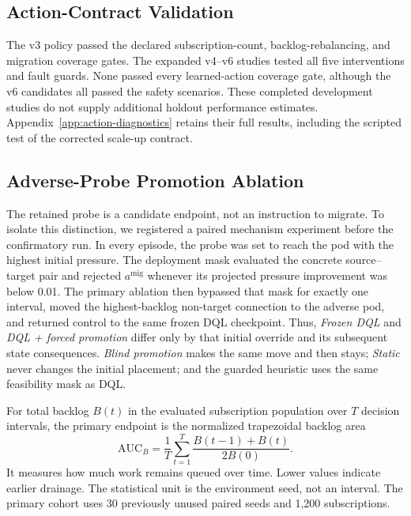 \subsection{Action-Contract Validation}

The v3 policy passed the declared subscription-count, backlog-rebalancing,
and migration coverage gates. The expanded v4--v6 studies tested all five
interventions and fault guards. None passed every learned-action coverage
gate, although the v6 candidates all passed the safety scenarios. These
completed development studies do not supply additional holdout performance
estimates. Appendix~\ref{app:action-diagnostics} retains their full results,
including the scripted test of the corrected scale-up contract.

\subsection{Adverse-Probe Promotion Ablation}
\label{sec:adverse-probe-ablation}

The retained probe is a candidate endpoint, not an instruction to migrate.
To isolate this distinction, we registered a paired mechanism experiment before
the confirmatory run. In every episode, the probe was set to reach the pod with the highest
initial pressure. The deployment mask evaluated the concrete
source--target pair and rejected $a^{\mathrm{mig}}$ whenever its projected
pressure improvement was below 0.01. The primary ablation then bypassed that
mask for exactly one interval, moved the highest-backlog non-target connection
to the adverse pod, and returned control to the same frozen DQL checkpoint.
Thus, \emph{Frozen DQL} and \emph{DQL + forced promotion} differ only by that
initial override and its subsequent state consequences. \emph{Blind
promotion} makes the same move and then stays; \emph{Static} never changes the
initial placement; and the guarded heuristic uses the same feasibility mask as
DQL.

For total backlog $B(t)$ in the evaluated subscription population over $T$
decision intervals, the primary endpoint is
the normalized trapezoidal backlog area
\begin{equation}
  \mathrm{AUC}_{B}=\frac{1}{T}
  \sum_{t=1}^{T}\frac{B(t-1)+B(t)}{2B(0)}.
  \label{eq:normalized-backlog-auc}
\end{equation}
It measures how much work remains queued over time. Lower values indicate
earlier drainage. The statistical unit is the environment seed, not an interval. The
primary cohort uses 30 previously unused paired seeds and 1,200 subscriptions.

